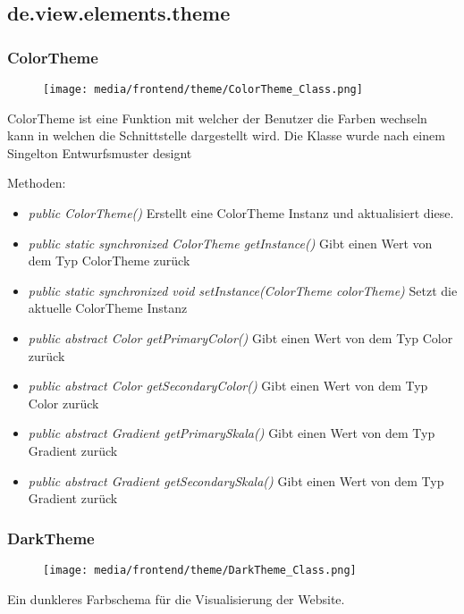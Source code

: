 \begin{itemize}
\subsection{de.view.elements.theme}

\subsubsection{ColorTheme}
\begin{minipage}{0.3\textwidth}
    \begin{figure}[H]
        \texttt{[image: media/frontend/theme/ColorTheme\_Class.png]}
    \end{figure}
    \end{minipage} \hfill
    \begin{minipage}{0.6\textwidth}
ColorTheme ist eine Funktion mit welcher der Benutzer die Farben wechseln kann in welchen die Schnittstelle dargestellt wird. Die Klasse wurde nach einem Singelton Entwurfsmuster designt
\end{minipage}

Methoden:
\begin{itemize} 
    \item \emph{public ColorTheme()} Erstellt eine ColorTheme Instanz und aktualisiert diese.
    \item \emph{public static synchronized ColorTheme getInstance()} Gibt einen Wert von dem Typ ColorTheme zurück
    \item \emph{public static synchronized void setInstance(ColorTheme colorTheme)} Setzt die aktuelle ColorTheme Instanz
    \item \emph{public abstract Color getPrimaryColor()} Gibt einen Wert von dem Typ Color zurück
    \item \emph{public abstract Color getSecondaryColor()} Gibt einen Wert von dem Typ Color zurück
    \item \emph{public abstract Gradient getPrimarySkala()} Gibt einen Wert von dem Typ Gradient zurück
    \item \emph{public abstract Gradient getSecondarySkala()}  Gibt einen Wert von dem Typ Gradient zurück
\end{itemize}

\subsubsection{DarkTheme}
\begin{minipage}{0.3\textwidth}
    \begin{figure}[H]
        \texttt{[image: media/frontend/theme/DarkTheme\_Class.png]}
    \end{figure}
    \end{minipage} \hfill
    \begin{minipage}{0.6\textwidth}
       Ein dunkleres Farbschema für die Visualisierung der Website.
    \end{minipage}


\end{itemize}
